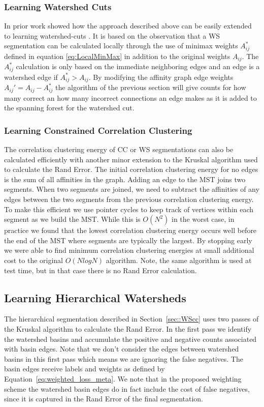 \documentclass[letterpaper,twocolumn,fleqn]{article}
\begin{document}
\subsubsection{Learning Watershed Cuts}
In prior work showed how the approach described above can be easily extended to learning watershed-cuts \cite{PorterOyenZimmer15}. It is based on the observation that a WS segmentation can be calculated locally through the use of minimax weights $A_{ij}^*$ defined in equation  \ref{eq:LocalMinMax} in addition to the original weights $A_{ij}$. The $A_{ij}^*$ calculation is only based on the immediate neighboring edges and an edge is a watershed edge if $A_{ij}^*>A_{ij}$. By modifying the affinity graph edge weights $A_{ij}'=A_{ij}-A_{ij}^*$ the algorithm of the previous section will give counts for how many correct an how many incorrect connections an edge makes as it is added to the spanning forest for the watershed cut.

\subsubsection{Learning Constrained Correlation Clustering}

The correlation clustering energy of CC or WS segmentations can also be calculated efficiently with another minor extension to the Kruskal algorithm used to calculate the Rand Error. The initial correlation clustering energy for no edges is the sum of all affinities in the graph. Adding an edge to the MST joins two segments. When two segments are joined, we need to subtract the affinities of any edges between the two segments from the previous correlation clustering energy. To make this efficient we use pointer cycles to keep track of vertices within each segment as we build the MST. While this is $O(N^2)$ in the worst case, in practice we found that the lowest correlation clustering energy occurs well before the end of the MST where segments are typically the largest. By stopping early we were able to find minimum correlation clustering energies at small additional cost to the original $O(NlogN)$ algorithm. Note, the same algorithm is used at test time, but in that case there is no Rand Error calculation. 

\subsection{Learning Hierarchical Watersheds}
\label{subsec:RE Hierarchy}
The hierarchical segmentation described in Section~\ref{sec::WScc} uses two passes of the Kruskal algorithm to calculate the Rand Error. In the first pass we identify the watershed basins and accumulate the positive and negative counts associated with basin edges. Note that we don't consider the edges between watershed basins in this first pass which means we are ignoring the false negatives. The basin edges receive labels and weights as defined by Equation~\ref{eq:weighted_loss_meta}. We note that in the proposed weighting scheme the watershed basin edges do in fact include the cost of false negatives, since it is captured in the Rand Error of the final segmentation. 
\end{document}
